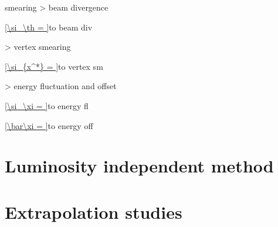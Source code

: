 \> smearing
\>> beam divergence

\eqref{\si_\th = }{to beam div}

\>> vertex smearing

\eqref{\si_{x^*} = }{to vertex sm}

\>> energy fluctuation and offset

\eqref{\si_\xi = }{to energy fl}

\eqref{\bar\xi = }{to energy off}

\section{Luminosity independent method}

\section{Extrapolation studies}



